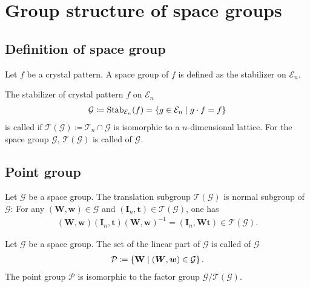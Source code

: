 \section{\label{sec:group_structure}Group structure of space groups}

\subsection{\label{sec:def_space_group}Definition of space group}

Let $f$ be a crystal pattern.
A space group of $f$ is defined as the stabilizer on $\mathcal{E}_{n}$.

\begin{screen}
  \begin{definition}
    The stabilizer of crystal pattern $f$ on $\mathcal{E}_{n}$
    \begin{align}
      \mathcal{G} \coloneqq \mathrm{Stab}_{\mathcal{E}_{n}} (f) = \left\{  g \in \mathcal{E}_{n}  \mathrel{}\middle|\mathrel{}  g \cdot f = f  \right\}
    \end{align}
    is called  if $\mathcal{T}(\mathcal{G}) \coloneqq \mathcal{T}_{n} \cap \mathcal{G}$ is isomorphic to a $n$-dimensional lattice.
    For the space group $\mathcal{G}$, $\mathcal{T}(\mathcal{G})$ is called  of $\mathcal{G}$.
  \end{definition}
\end{screen}

\subsection{Point group}

Let $\mathcal{G}$ be a space group.
The translation subgroup $\mathcal{T}(\mathcal{G})$ is normal subgroup of $\mathcal{G}$:
For any $ (\mathbf{W}, \mathbf{w}) \in \mathcal{G}$ and $(\mathbf{I}_{n}, \mathbf{t}) \in \mathcal{T}(\mathcal{G})$, one has
\begin{align}
  (\bm{W}, \bm{w}) (\bm{I}_{n}, \bm{t}) (\bm{W}, \bm{w})^{-1} = (\bm{I}_{n}, \bm{Wt}) \in \mathcal{T}(\mathcal{G}).
\end{align}

\begin{screen}
  \begin{definition}
    Let $\mathcal{G}$ be a space group.
    The set of the linear part of $\mathcal{G}$ is called  of $\mathcal{G}$
    \begin{align}
      \mathcal{P} \coloneqq \left\{  \mathbf{W}  \mathrel{}\middle|\mathrel{}  (\bm{W}, \bm{w}) \in \mathcal{G}  \right\}.
    \end{align}
    The point group $\mathcal{P}$ is isomorphic to the factor group $\mathcal{G} / \mathcal{T}(\mathcal{G})$.
  \end{definition}
\end{screen}

